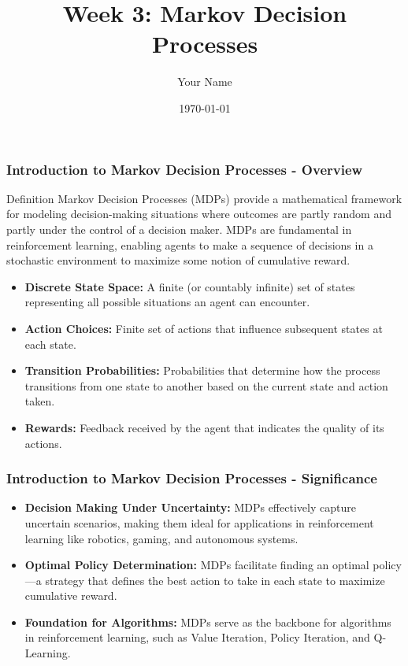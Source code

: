 \documentclass{beamer}
\title{Week 3: Markov Decision Processes}
\author{Your Name}
\institute{Your Institution}
\date{\today}
\begin{document}
\frame{\titlepage}

\begin{frame}[fragile]
    \frametitle{Introduction to Markov Decision Processes - Overview}
    \begin{block}{Definition}
        Markov Decision Processes (MDPs) provide a mathematical framework for modeling decision-making situations where outcomes are partly random and partly under the control of a decision maker. MDPs are fundamental in reinforcement learning, enabling agents to make a sequence of decisions in a stochastic environment to maximize some notion of cumulative reward.
    \end{block}

    \begin{itemize}
        \item \textbf{Discrete State Space:} A finite (or countably infinite) set of states representing all possible situations an agent can encounter.
        \item \textbf{Action Choices:} Finite set of actions that influence subsequent states at each state.
        \item \textbf{Transition Probabilities:} Probabilities that determine how the process transitions from one state to another based on the current state and action taken.
        \item \textbf{Rewards:} Feedback received by the agent that indicates the quality of its actions.
    \end{itemize}
\end{frame}

\begin{frame}[fragile]
    \frametitle{Introduction to Markov Decision Processes - Significance}
    \begin{itemize}
        \item \textbf{Decision Making Under Uncertainty:} MDPs effectively capture uncertain scenarios, making them ideal for applications in reinforcement learning like robotics, gaming, and autonomous systems.
        \item \textbf{Optimal Policy Determination:} MDPs facilitate finding an optimal policy—a strategy that defines the best action to take in each state to maximize cumulative reward.
        \item \textbf{Foundation for Algorithms:} MDPs serve as the backbone for algorithms in reinforcement learning, such as Value Iteration, Policy Iteration, and Q-Learning.
    \end{itemize}
\end{frame}
\end{document}
